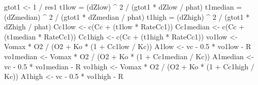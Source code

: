 \documentclass[
]{krantz}
\makeatletter
\newenvironment{Shaded}{\begin{snugshade}}{\end{snugshade}}
\newcommand{\DecValTok}[1]{\textcolor[rgb]{0.00,0.00,0.81}{#1}}
\newcommand{\FloatTok}[1]{\textcolor[rgb]{0.00,0.00,0.81}{#1}}
\newcommand{\FunctionTok}[1]{\textcolor[rgb]{0.00,0.00,0.00}{#1}}
\newcommand{\NormalTok}[1]{#1}
\newcommand{\OtherTok}[1]{\textcolor[rgb]{0.56,0.35,0.01}{#1}}
\newcommand{\SpecialCharTok}[1]{\textcolor[rgb]{0.00,0.00,0.00}{#1}}
\newenvironment{kframe}{%
\medskip{}
\setlength{\fboxsep}{.8em}
 \def\at@end@of@kframe{}%
 \ifinner\ifhmode%
  \def\at@end@of@kframe{\end{minipage}}%
  \begin{minipage}{\columnwidth}%
 \fi\fi%
 \def\FrameCommand##1{\hskip\@totalleftmargin \hskip-\fboxsep
 \colorbox{shadecolor}{##1}\hskip-\fboxsep
     \hskip-\linewidth \hskip-\@totalleftmargin \hskip\columnwidth}%
 \MakeFramed {\advance\hsize-\width
   \@totalleftmargin\z@ \linewidth\hsize
   \@setminipage}}%
 {\par\unskip\endMakeFramed%
 \at@end@of@kframe}
\renewenvironment{Shaded}{\begin{kframe}}{\end{kframe}}
\makeatother
\begin{document}
\begin{Shaded}
\begin{Highlighting}[]
\NormalTok{gtot1 }\OtherTok{\textless{}{-}} \DecValTok{1} \SpecialCharTok{/}\NormalTok{ res1}
\NormalTok{t1low }\OtherTok{=}\NormalTok{ (dZlow) }\SpecialCharTok{\^{}} \DecValTok{2} \SpecialCharTok{/}\NormalTok{ (gtot1 }\SpecialCharTok{*}\NormalTok{ dZlow }\SpecialCharTok{/}\NormalTok{ phat)}
\NormalTok{t1median }\OtherTok{=}\NormalTok{ (dZmedian) }\SpecialCharTok{\^{}} \DecValTok{2} \SpecialCharTok{/}\NormalTok{ (gtot1 }\SpecialCharTok{*}\NormalTok{ dZmedian }\SpecialCharTok{/}\NormalTok{ phat)}
\NormalTok{t1high }\OtherTok{=}\NormalTok{ (dZhigh) }\SpecialCharTok{\^{}} \DecValTok{2} \SpecialCharTok{/}\NormalTok{ (gtot1 }\SpecialCharTok{*}\NormalTok{ dZhigh }\SpecialCharTok{/}\NormalTok{ phat)}
\NormalTok{Cc1low }\OtherTok{\textless{}{-}} \FunctionTok{c}\NormalTok{(Cc }\SpecialCharTok{+}\NormalTok{ (t1low }\SpecialCharTok{*}\NormalTok{ RateCc1))}
\NormalTok{Cc1median }\OtherTok{\textless{}{-}} \FunctionTok{c}\NormalTok{(Cc }\SpecialCharTok{+}\NormalTok{ (t1median }\SpecialCharTok{*}\NormalTok{ RateCc1))}
\NormalTok{Cc1high }\OtherTok{\textless{}{-}} \FunctionTok{c}\NormalTok{(Cc }\SpecialCharTok{+}\NormalTok{ (t1high }\SpecialCharTok{*}\NormalTok{ RateCc1))}
\NormalTok{vo1low }\OtherTok{\textless{}{-}}\NormalTok{ Vomax }\SpecialCharTok{*}\NormalTok{ O2 }\SpecialCharTok{/}\NormalTok{ (O2 }\SpecialCharTok{+}\NormalTok{ Ko }\SpecialCharTok{*}\NormalTok{ (}\DecValTok{1} \SpecialCharTok{+}\NormalTok{ Cc1low }\SpecialCharTok{/}\NormalTok{ Kc)) }
\NormalTok{A1low }\OtherTok{\textless{}{-}}\NormalTok{ vc }\SpecialCharTok{{-}} \FloatTok{0.5} \SpecialCharTok{*}\NormalTok{ vo1low }\SpecialCharTok{{-}}\NormalTok{ R }
\NormalTok{vo1median }\OtherTok{\textless{}{-}}\NormalTok{ Vomax }\SpecialCharTok{*}\NormalTok{ O2 }\SpecialCharTok{/}\NormalTok{ (O2 }\SpecialCharTok{+}\NormalTok{ Ko }\SpecialCharTok{*}\NormalTok{ (}\DecValTok{1} \SpecialCharTok{+}\NormalTok{ Cc1median }\SpecialCharTok{/}\NormalTok{ Kc)) }
\NormalTok{A1median }\OtherTok{\textless{}{-}}\NormalTok{ vc }\SpecialCharTok{{-}} \FloatTok{0.5} \SpecialCharTok{*}\NormalTok{ vo1median }\SpecialCharTok{{-}}\NormalTok{ R }
\NormalTok{vo1high }\OtherTok{\textless{}{-}}\NormalTok{ Vomax }\SpecialCharTok{*}\NormalTok{ O2 }\SpecialCharTok{/}\NormalTok{ (O2 }\SpecialCharTok{+}\NormalTok{ Ko }\SpecialCharTok{*}\NormalTok{ (}\DecValTok{1} \SpecialCharTok{+}\NormalTok{ Cc1high }\SpecialCharTok{/}\NormalTok{ Kc)) }
\NormalTok{A1high }\OtherTok{\textless{}{-}}\NormalTok{ vc }\SpecialCharTok{{-}} \FloatTok{0.5} \SpecialCharTok{*}\NormalTok{ vo1high }\SpecialCharTok{{-}}\NormalTok{ R }


\end{Highlighting}
\end{Shaded}
\end{document}
